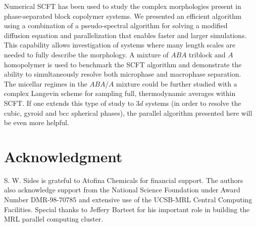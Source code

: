 \documentclass[onecolumn,amsmath,amssymb,floatfix]{elsart}
\begin{document}
Numerical SCFT has been used to study the complex morphologies
present in phase-separated block copolymer systems. We presented
an efficient algorithm using a combination of a pseudo-spectral
algorithm for solving a modified diffusion equation and
parallelization that enables faster and larger simulations. This
capability allows investigation of systems where many length
scales are needed to fully describe the morphology. A mixture of
$ABA$ triblock and $A$ homopolymer is used to benchmark the SCFT
algorithm and demonstrate the ability to simultaneously resolve
both microphase and macrophase separation. The micellar regimes in
the $ABA$/$A$ mixture could be further studied with a complex
Langevin scheme \cite{glenn_review_02} for sampling full,
thermodynamic averages within SCFT.
If one extends this type of
study to $3d$ systems (in order to resolve the cubic, gyroid and
bcc spherical phases), the parallel algorithm presented here will
be even more helpful.




\section{Acknowledgment}

S. W. Sides is grateful to  Atofina Chemicals for financial
support. The authors also acknowledge support from the National
Science Foundation under Award Number DMR-98-70785 and extensive
use of the UCSB-MRL Central Computing Facilities.
Special thanks to Jeffery Barteet for his important role in
building the MRL parallel computing cluster.





\end{document}
